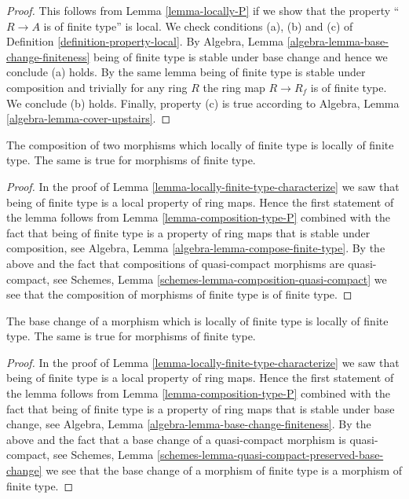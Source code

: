 \begin{proof}
This follows from Lemma \ref{lemma-locally-P} if we show that
the property ``$R \to A$ is of finite type'' is local.
We check conditions (a), (b) and (c) of Definition
\ref{definition-property-local}.
By Algebra, Lemma \ref{algebra-lemma-base-change-finiteness}
being of finite type is stable under base change and hence
we conclude (a) holds. By the same lemma being of finite type
is stable under composition and trivially for any ring
$R$ the ring map $R \to R_f$ is of finite type.
We conclude (b) holds. Finally, property (c) is true
according to Algebra, Lemma \ref{algebra-lemma-cover-upstairs}.
\end{proof}

\begin{lemma}
\label{lemma-composition-finite-type}
The composition of two morphisms which locally of finite type is
locally of finite type. The same is true for morphisms of finite type.
\end{lemma}

\begin{proof}
In the proof of Lemma \ref{lemma-locally-finite-type-characterize}
we saw that being of finite type is a local property of ring maps.
Hence the first statement of the lemma follows from
Lemma \ref{lemma-composition-type-P} combined
with the fact that being of finite type is a property of ring maps that is
stable under composition, see
Algebra, Lemma \ref{algebra-lemma-compose-finite-type}.
By the above and the fact that compositions of
quasi-compact morphisms are quasi-compact, see
Schemes, Lemma \ref{schemes-lemma-composition-quasi-compact}
we see that the composition of morphisms of finite type is
of finite type.
\end{proof}

\begin{lemma}
\label{lemma-base-change-finite-type}
The base change of a morphism which is locally of finite type
is locally of finite type. The same is true for morphisms of
finite type.
\end{lemma}

\begin{proof}
In the proof of Lemma \ref{lemma-locally-finite-type-characterize}
we saw that being of finite type is a local property of ring maps.
Hence the first statement of the lemma follows from
Lemma \ref{lemma-composition-type-P} combined
with the fact that being of finite type is a property of ring maps that is
stable under base change, see
Algebra, Lemma \ref{algebra-lemma-base-change-finiteness}.
By the above and the fact that a base change of a
quasi-compact morphism is quasi-compact, see
Schemes, Lemma \ref{schemes-lemma-quasi-compact-preserved-base-change}
we see that the base change of a morphism of finite type is
a morphism of finite type.
\end{proof}

